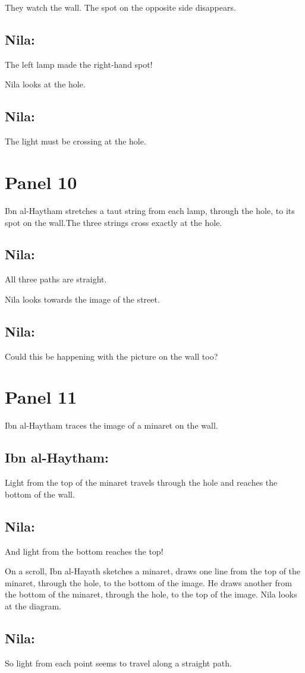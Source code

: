 \documentclass{xtufte-handout}
\begin{document}
They watch the wall. The spot on the opposite side disappears.
\subsection{Nila:} The left lamp made the right-hand spot!

Nila looks at the hole.
\subsection{Nila:} The light must be crossing at the hole.
\section{Panel 10}
Ibn al-Haytham stretches a taut string from each lamp, through the hole, to its spot on the wall.The three strings cross exactly at the hole.
\subsection{Nila:} All three paths are straight.

Nila looks towards the image of the street.
\subsection{Nila:} Could this be happening with the picture on the wall too?
\section{Panel 11}
Ibn al-Haytham traces the image of a minaret on the wall.
\subsection{Ibn al-Haytham:} Light from the top of the minaret travels through the hole and reaches the bottom of the wall.
\subsection{Nila:} And light from the bottom reaches the top!

On a scroll, Ibn al-Hayath sketches a minaret, draws one line from the top of the minaret, through the hole, to the bottom of the image. He draws another from the bottom of the minaret, through the hole, to the top of the image. Nila looks at the diagram.

\subsection{Nila:}So light from each point seems to travel along a straight path.
\end{document}
